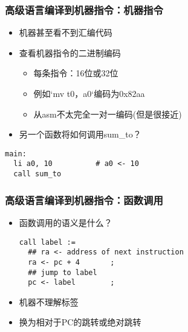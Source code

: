 \begin{frame}[fragile]
\frametitle{高级语言编译到机器指令：\small{机器指令}}
	
\begin{itemize}
	
	\item 机器甚至看不到汇编代码
	\item 查看机器指令的二进制编码
	\begin{itemize}
		\item 每条指令：16位或32位
		\item 例如`mv t0，a0`编码为0x82aa
		\item 从asm不太完全一对一编码(但是很接近)
	\end{itemize}
	
	\item 另一个函数将如何调用sum\_to？
\end{itemize}	

\begin{lstlisting}
main:
  li a0, 10          # a0 <- 10
  call sum_to
\end{lstlisting}

	
\end{frame}

\begin{frame}[fragile]
\frametitle{高级语言编译到机器指令：\small{函数调用}}
	
\begin{itemize}
	
	\item 函数调用的语义是什么？	


\begin{block}{}
\begin{verbatim}
call label :=
  ## ra <- address of next instruction
  ra <- pc + 4       ;
  ## jump to label
  pc <- label        ; 
\end{verbatim}
\end{block}  
\item 机器不理解标签
\item 换为相对于PC的跳转或绝对跳转	
\end{itemize}

\end{frame}




